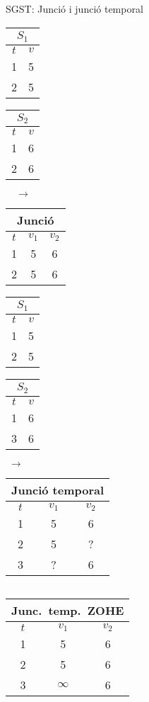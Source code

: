 \begin{frame}{SGST: Junció i junció temporal }

\begin{center}

    \begin{tabular}[h]{|c|c|}
    \multicolumn{2}{c}{$S_1$} \\ \hline
      $t$ & $v$ \\\hline
      1 & 5 \\
      2 & 5 \\\hline
    \end{tabular}
    \begin{tabular}[h]{|c|c|}
    \multicolumn{2}{c}{$S_2$} \\ \hline
      $t$ & $v$ \\\hline
      1 & 6 \\
      2 & 6 \\\hline
    \end{tabular}$\quad\longrightarrow\quad$
    \begin{tabular}[h]{|c|c|c|}
    \multicolumn{3}{c}{Junció} \\ \hline
      $t$ & $v_1$ & $v_2$ \\\hline
      1 & 5 & 6  \\
      2 & 5 & 6\\\hline
    \end{tabular}

\bigskip

    \begin{tabular}[h]{|c|c|}
    \multicolumn{2}{c}{$S_1$} \\ \hline
      $t$ & $v$ \\\hline
      1 & 5 \\
      2 & 5 \\\hline
    \end{tabular}
    \begin{tabular}[h]{|c|c|}
    \multicolumn{2}{c}{$S_2$} \\ \hline
      $t$ & $v$ \\\hline
      1 & 6 \\
      3 & 6 \\\hline
    \end{tabular}$\;\longrightarrow\;$
    \begin{tabular}[h]{|c|c|c|}
    \multicolumn{3}{c}{Junció temporal} \\ \hline
      $t$ & $v_1$ & $v_2$ \\\hline
      1 & 5 & 6  \\
      2 & 5 & ?  \\
      3 & ? & 6\\\hline
    \end{tabular}$\quad$
    \begin{tabular}[h]{|c|c|c|}
    \multicolumn{3}{c}{Junc.~temp.~ZOHE} \\ \hline
      $t$ & $v_1$ & $v_2$ \\\hline
      1 & 5 & 6  \\
      2 & 5 & 6  \\
      3 & $\infty$ & 6\\\hline
    \end{tabular}


\end{center}
\end{frame}
